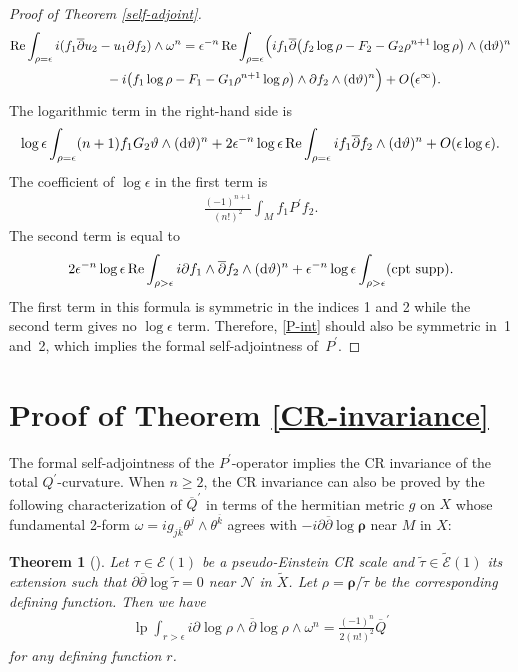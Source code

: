 \documentclass[10pt,a4paper]{amsart}
\numberwithin{equation}{section}
\newtheorem{Theorem}{Theorem}[section]
\begin{document}
\begin{proof}[Proof of Theorem \ref{self-adjoint}]
\begin{gather*}
\operatorname{Re}\int_{\rho=\epsilon} i(f_1\overline{\partial}u_2-u_1\partial f_2)\wedge\omega^n
 =\epsilon^{-n}\operatorname{Re}\int_{\rho=\epsilon} \Bigl(if_1\overline{\partial}\big(f_2\log\rho-F_2-G_2\rho^{n+1}\log\rho\big)
\wedge({\rm d}\vartheta)^n \\
 \qquad {} -i\big(f_1\log\rho-F_1-G_1\rho^{n+1}\log\rho\big)\wedge\partial f_2\wedge ({\rm d}\vartheta)^n\Bigr)+O\big(\epsilon^\infty\big).
\end{gather*}
The logarithmic term in the right-hand side is
\begin{gather*}
\log\epsilon\int_{\rho=\epsilon}(n+1)f_1G_2\vartheta\wedge({\rm d}\vartheta)^n+2\epsilon^{-n}\log\epsilon
 \operatorname{Re}\int_{\rho=\epsilon}if_1\overline{\partial}f_2\wedge({\rm d}\vartheta)^n+O(\epsilon\log\epsilon).
\end{gather*}
The coef\/f\/icient of $\log\epsilon$ in the f\/irst term is
\begin{gather}\label{P-int}
\frac{(-1)^{n+1}}{(n!)^2}\int_M f_1P^\prime f_2.
\end{gather}
The second term is equal to
\begin{gather*}
2\epsilon^{-n}\log\epsilon \operatorname{Re}\int_{\rho>\epsilon} i\partial f_1\wedge\overline{\partial}f_2\wedge({\rm d}\vartheta)^n
+\epsilon^{-n}\log\epsilon\int_{\rho>\epsilon} ({\rm cpt\ supp}).
\end{gather*}
The f\/irst term in this formula is symmetric in the indices 1 and 2 while the second term gives no $\log\epsilon$ term. Therefore, \eqref{P-int} should also be symmetric in~1 and~2, which implies the formal self-adjointness of~$P^\prime$.
\end{proof}

\section{Proof of Theorem \ref{CR-invariance}}
The formal self-adjointness of the $P^\prime$-operator implies the CR invariance of the total $Q^\prime$-curva\-tu\-re. When $n\ge 2$, the CR invariance can also be proved by the following characterization of $\overline{Q}^\prime$ in terms of the hermitian metric $g$ on $X$ whose fundamental 2-form $\omega=ig_{j\overline k}\theta^j\wedge\theta^{\overline k}$ agrees with $-i\partial\overline{\partial}\log\boldsymbol\rho$ near $M$ in $X$:

\begin{Theorem}[{\cite[Theorem 5.6]{Hirachi}}]\label{total-Q-prime}
Let $\tau\in\mathcal{E}(1)$ be a pseudo-Einstein CR scale and $\widetilde\tau\in\widetilde{\mathcal{E}}(1)$ its extension such that $\partial\overline{\partial}\log\widetilde\tau=0$ near $\mathcal{N}$ in $\widetilde X$. Let $\rho=\boldsymbol\rho/\widetilde\tau$ be the corresponding defining function. Then we have
\begin{gather}\label{Q-prime-lp}
\operatorname{lp}\int_{r>\epsilon} i\partial\log \rho\wedge \overline{\partial}\log\rho\wedge \omega^n
=\frac{(-1)^n}{2(n!)^2}\overline{Q}^\prime
\end{gather}
for any defining function $r$.
\end{Theorem}
\end{document}
